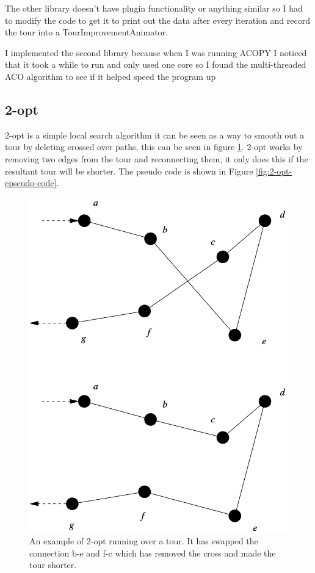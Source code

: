 The other library doesn't have plugin functionality or anything similar so I had to modify the code to get it to print out the data after every iteration and record the tour into a TourImprovementAnimator.

I implemented the second library because when I was running ACOPY I noticed that it took a while to run and only used one core so I found the multi-threaded ACO algorithm to see if it helped speed the program up

\subsection{2-opt}

2-opt is a simple local search algorithm it can be seen as a way to smooth out a tour by deleting crossed over paths, this can be seen in figure \ref{fig:2-opt-example}. 2-opt works by removing two edges from the tour and reconnecting them, it only does this if the resultant tour will be shorter. The pseudo code is shown in Figure \ref{fig:2-opt-epseudo-code}.

\begin{figure}[h]
    \centering
    \includegraphics[width=\textwidth]{figures/2-opt-example.png}
    \caption{An example of 2-opt running over a tour. It has swapped the connection b-e and f-c which has removed the cross and made the tour shorter.\cite{2_opt_example_picture}}
    \label{fig:2-opt-example}
\end{figure}

